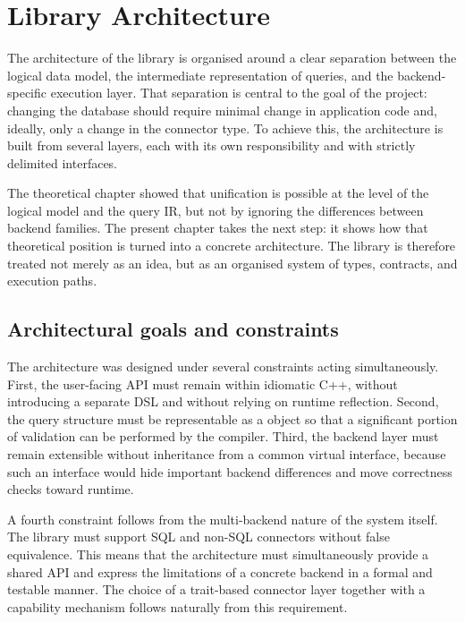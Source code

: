 \section{Library Architecture}
\label{sec:architecture}

The architecture of the library is organised around a clear separation between the logical data model, the intermediate representation of queries, and the backend-specific execution layer. That separation is central to the goal of the project: changing the database should require minimal change in application code and, ideally, only a change in the connector type. To achieve this, the architecture is built from several layers, each with its own responsibility and with strictly delimited interfaces.

The theoretical chapter showed that unification is possible at the level of the logical model and the query IR, but not by ignoring the differences between backend families. The present chapter takes the next step: it shows how that theoretical position is turned into a concrete architecture. The library is therefore treated not merely as an idea, but as an organised system of types, contracts, and execution paths.

\subsection{Architectural goals and constraints}

The architecture was designed under several constraints acting simultaneously. First, the user-facing API must remain within idiomatic C++, without introducing a separate DSL and without relying on runtime reflection. Second, the query structure must be representable as a  object so that a significant portion of validation can be performed by the compiler. Third, the backend layer must remain extensible without inheritance from a common virtual interface, because such an interface would hide important backend differences and move correctness checks toward runtime.

A fourth constraint follows from the multi-backend nature of the system itself. The library must support SQL and non-SQL connectors without false equivalence. This means that the architecture must simultaneously provide a shared API and express the limitations of a concrete backend in a formal and testable manner. The choice of a trait-based connector layer together with a capability mechanism follows naturally from this requirement.

